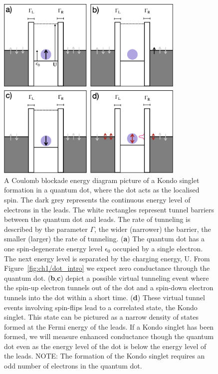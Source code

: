 \begin{figure}[ht]
  \begin{center}
    \includegraphics[width=0.8\textwidth]{figures/ch2/crop_PosterFiguresMaster.007.png}
    \caption[Kondo effect in a quantum dot: Coulomb blockade energy diagrams]{\label{fig:ch2/kondo_dot_diagram} 
    A Coulomb blockade energy diagram picture of a Kondo singlet formation in a quantum dot, where the dot acts as the localised spin. The dark grey represents the continuous energy level of electrons in the leads. The white rectangles represent tunnel barriers between the quantum dot and leads. The rate of tunneling is described by the parameter $\Gamma$, the wider (narrower) the barrier, the smaller (larger) the rate of tunneling. (\textbf{a}) The quantum dot has a one spin-degenerate energy level $\mathrm{\epsilon_0}$ occupied by a single electron. The next energy level is separated by the charging energy, $\mathrm{U}$. From Figure~\ref{fig:ch1/dot_intro} we expect zero conductance through the quantum dot. (\textbf{b},\textbf{c}) depict a possible virtual tunneling event where the spin-up electron tunnels out of the dot and a spin-down electron tunnels into the dot within a short time. (\textbf{d}) These virtual tunnel events involving spin-flips lead to a correlated state, the Kondo singlet. This state can be pictured as a narrow density of states formed at the Fermi energy of the leads. If a Kondo singlet has been formed, we will measure enhanced conductance though the quantum dot even as the energy level of the dot is below the energy level of the leads. NOTE: The formation of the Kondo singlet requires an odd number of electrons in the quantum dot.
      }
  \end{center}
\end{figure}


